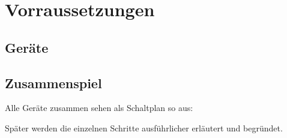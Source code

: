 \section{Vorraussetzungen}


\subsection{Geräte}

\subsection{Zusammenspiel}

Alle Geräte zusammen sehen als Schaltplan so aus:

Später werden die einzelnen Schritte ausführlicher erläutert und begründet.